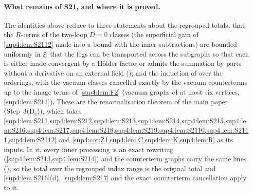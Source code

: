 \paragraph{What remains of S21, and where it is proved.} The identities above reduce \cite[(3.5)]{Ba3} to three statements about the regrouped totals: that the $R$-terms of the two-loop $D=0$ classes (the superficial gain of \cref{sup4:lem:S2112} made into a bound with the inner subtractions) are bounded uniformly in $\xi$; that the legs can be transported across the subgraphs \cite[(2.4)]{Ba3} so that each is either made convergent by a H\"older factor or admits the summation by parts \cite[(2.8)]{Ba3} without a derivative on an external field (\cite[p.~443]{Ba3}); and the induction of \cite[pp.~444--445]{Ba3} over the orderings, with the vacuum classes cancelled exactly by the vacuum counterterms \cite[(1.24)]{Ba3} up to the image terms of \cref{sup4:lem:F2} (vacuum graphs of at most six vertices, \cref{sup4:lem:S211}). These are the renormalisation theorem of the main paper (Step~3(D$_4$)), which takes \cref{sup4:lem:S211,sup4:lem:S212,sup4:lem:S213,sup4:lem:S214,sup4:lem:S215,sup4:lem:S216,sup4:lem:S217,sup4:lem:S218,sup4:lem:S219,sup4:lem:S2110,sup4:lem:S2111,sup4:lem:S2112} and \cref{sup4:cor:Z1,sup4:lem:C,sup4:lem:K,sup4:lem:R} as its inputs. In it, every inner processing is an exact rewriting (\cref{sup4:lem:S213,sup4:lem:S214}) and the counterterm graphs carry the same lines (\cite[p.~417]{Ba3}), so the total over the regrouped index range is the original total and \cref{sup4:lem:S216}(d), \cref{sup4:lem:S217} and the exact counterterm cancellation apply to it.
